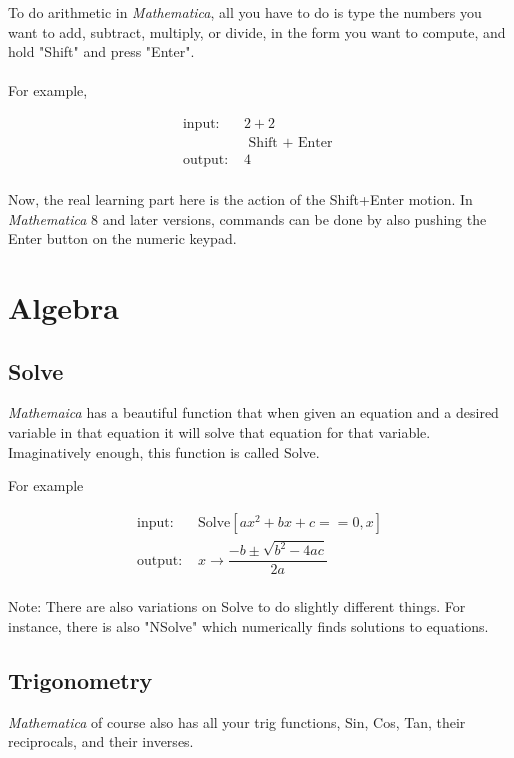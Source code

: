 \documentclass[11pt,a4paper,twoside]{article}
\begin{document}
			To do arithmetic in \textit{Mathematica}, all you have to do is type the numbers you want to add, subtract, multiply, or divide, in the form you want to compute, and hold "Shift" and press "Enter".
			\\
			\\
			For example, 
			
			\begin{align*}
				\text{input: }& 2 + 2 \\
				& \text{ Shift + Enter } \\
				\text{output: }& 4 \\
			\end{align*}
			
			Now, the real learning part here is the action of the Shift+Enter motion.  In \textit{Mathematica} 8 and later versions, commands can be done by also pushing the Enter button on the numeric keypad.
		
		\section{Algebra}
				
			\subsection{Solve}				
						
				\textit{Mathemaica} has a beautiful function that when given an equation and a desired variable in that equation it will solve that equation for that variable.  Imaginatively enough, this function is called Solve.
						
				For example
					
				\begin{align*}
					\text{input: }& \text{Solve}[ ax^2 + bx + c == 0, x ] \\
					\text{output: }& x \rightarrow \dfrac{ -b \pm \sqrt{b^2 - 4ac } }{ 2a } \\
				\end{align*}
						
				Note: There are also variations on Solve to do slightly different things.  For instance, there is also "NSolve" which numerically finds solutions to equations.
						
			\subsection{Trigonometry}
					
				\textit{Mathematica} of course also has all your trig functions, Sin, Cos, Tan, their reciprocals, and their inverses.  
						
\end{document}
